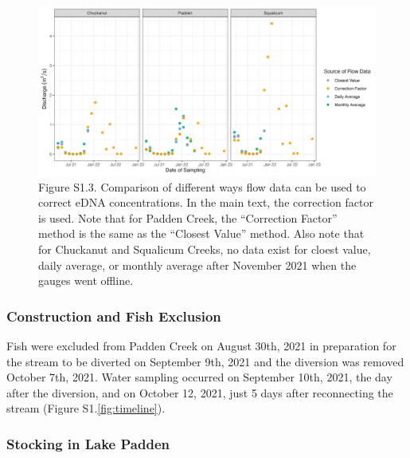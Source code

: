 \documentclass[
]{article}
\begin{document}
\begin{figure}
\centering
\includegraphics{../Output/SupplementalFigures/flow_by_source.png}
\caption{Figure S1.3. Comparison of different ways flow data can be used
to correct eDNA concentrations. In the main text, the correction factor
is used. Note that for Padden Creek, the ``Correction Factor'' method is
the same as the ``Closest Value'' method. Also note that for Chuckanut
and Squalicum Creeks, no data exist for cloest value, daily average, or
monthly average after November 2021 when the gauges went
offline.\label{fig:dischargemethod}}
\end{figure}

\hypertarget{construction-and-fish-exclusion}{%
\subsubsection{Construction and Fish
Exclusion}\label{construction-and-fish-exclusion}}

Fish were excluded from Padden Creek on August 30th, 2021 in preparation
for the stream to be diverted on September 9th, 2021 and the diversion
was removed October 7th, 2021. Water sampling occurred on September
10th, 2021, the day after the diversion, and on October 12, 2021, just 5
days after reconnecting the stream (Figure S1.\ref{fig:timeline}).

\hypertarget{stocking-in-lake-padden}{%
\subsubsection{Stocking in Lake Padden}\label{stocking-in-lake-padden}}
\end{document}
